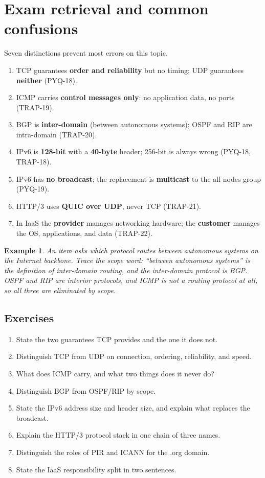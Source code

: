 \documentclass[11pt]{article}
\newtheorem{example}{Example}[section]
\begin{document}
\section{Exam retrieval and common confusions}
Seven distinctions prevent most errors on this topic.
\begin{enumerate}
  \item TCP guarantees \textbf{order and reliability} but no timing; UDP
    guarantees \textbf{neither} (PYQ-18).
  \item ICMP carries \textbf{control messages only}: no application data, no
    ports (TRAP-19).
  \item BGP is \textbf{inter-domain} (between autonomous systems); OSPF and
    RIP are intra-domain (TRAP-20).
  \item IPv6 is \textbf{128-bit} with a \textbf{40-byte} header; 256-bit is
    always wrong (PYQ-18, TRAP-18).
  \item IPv6 has \textbf{no broadcast}; the replacement is
    \textbf{multicast} to the all-nodes group (PYQ-19).
  \item HTTP/3 uses \textbf{QUIC over UDP}, never TCP (TRAP-21).
  \item In IaaS the \textbf{provider} manages networking hardware; the
    \textbf{customer} manages the OS, applications, and data (TRAP-22).
\end{enumerate}

\begin{example}
An item asks which protocol routes between autonomous systems on the
Internet backbone. Trace the scope word: ``between autonomous systems'' is
the definition of inter-domain routing, and the inter-domain protocol is BGP.
OSPF and RIP are interior protocols, and ICMP is not a routing protocol at
all, so all three are eliminated by scope.
\end{example}

\subsection*{Exercises}
\begin{enumerate}[label=\arabic*.]
  \item State the two guarantees TCP provides and the one it does not.
  \item Distinguish TCP from UDP on connection, ordering, reliability, and
    speed.
  \item What does ICMP carry, and what two things does it never do?
  \item Distinguish BGP from OSPF/RIP by scope.
  \item State the IPv6 address size and header size, and explain what replaces
    the broadcast.
  \item Explain the HTTP/3 protocol stack in one chain of three names.
  \item Distinguish the roles of PIR and ICANN for the .org domain.
  \item State the IaaS responsibility split in two sentences.
\end{enumerate}
\end{document}

